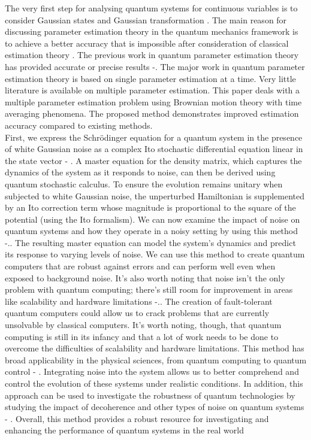 \documentclass[journal,twocolumn]{IEEEtran}
\begin{document}
The very first step for analysing quantum systems for continuous variables is to consider Gaussian states and Gaussian transformation \cite{Ref7}. The main reason for discussing parameter estimation theory in the quantum mechanics framework is to achieve a better accuracy that is impossible after consideration of classical estimation theory \cite{Ref8}. The previous work in quantum parameter estimation theory has provided accurate or precise results \cite{Ref9}-\cite{Ref11}. The major work in quantum parameter estimation theory is based on single parameter estimation at a time. Very little literature is available on multiple parameter estimation. This paper deals with a multiple parameter estimation problem using Brownian motion theory with time averaging phenomena. The proposed method demonstrates improved estimation accuracy compared to existing methods.\\ First, we express the Schrödinger equation for a quantum system in the presence of white Gaussian noise as a complex Ito stochastic differential equation linear in the state vector \cite{Ref22} - \cite{Ref27}. A master equation for the density matrix, which captures the dynamics of the system as it responds to noise, can then be derived using quantum stochastic calculus. To ensure the evolution remains unitary when subjected to white Gaussian noise, the unperturbed Hamiltonian is supplemented by an Ito correction term whose magnitude is proportional to the square of the potential (using the Ito formalism). We can now examine the impact of noise on quantum systems and how they operate in a noisy setting by using this method \cite{Ref24}-\cite{Ref29}.. The resulting master equation can model the system's dynamics and predict its response to varying levels of noise.  We can use this method to create quantum computers that are robust against errors and can perform well even when exposed to background noise. It's also worth noting that noise isn't the only problem with quantum computing; there's still room for improvement in areas like scalability and hardware limitations \cite{Ref30}-\cite{Ref36}.. The creation of fault-tolerant quantum computers could allow us to crack problems that are currently unsolvable by classical computers. It's worth noting, though, that quantum computing is still in its infancy and that a lot of work needs to be done to overcome the difficulties of scalability and hardware limitations. This method has broad applicability in the physical sciences, from quantum computing to quantum control \cite{Ref35}- \cite{Ref39}. Integrating noise into the system allows us to better comprehend and control the evolution of these systems under realistic conditions. In addition, this approach can be used to investigate the robustness of quantum technologies by studying the impact of decoherence and other types of noise on quantum systems \cite{Ref40}- \cite{Ref44}. Overall, this method provides a robust resource for investigating and enhancing the performance of quantum systems in the real world
\end{document}

